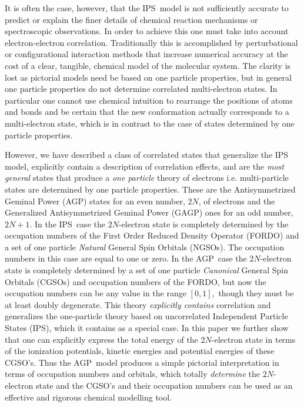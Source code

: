 \documentclass{preprint}
\begin{document}
It is often the case, however, that the IPS\ model is not sufficiently
accurate to predict or explain the finer details of chemical reaction
mechanisms or spectroscopic observations. In order to achieve this one must
take into account electron-electron correlation. Traditionally this is
accomplished by perturbational or configurational interaction methods that
increase numerical accuracy at the cost of a clear, tangible, chemical model
of the molecular system. The clarity is lost as pictorial models need be
based on one particle properties, but in general one particle properties do
not determine correlated multi-electron states. In particular one cannot use
chemical intuition to rearrange the positions of atoms and bonds and be
certain that the new conformation actually corresponds to a multi-electron
state, which is in contrast to the case of states determined by one particle
properties.

However, we have described \cite{Weiner&ortiz04} a class of correlated
states that generalize the IPS model, explicitly contain a description of
correlation effects, and are the \emph{most general} states that produce a
\emph{one particle} theory of electrons i.e. multi-particle states are
determined by one particle properties. These are the Antisymmetrized Geminal
Power (AGP) states for an even number, $2N$, of electrons and the
Generalized Antisymmetrized Geminal Power (GAGP) ones for an odd number, $%
2N+1$. In the IPS\ case the $2N$-electron state is completely determined by
the occupation numbers of the First Order Reduced Density Operator (FORDO)
and a set of one particle \emph{Natural }General Spin Orbitals (NGSOs). The
occupation numbers in this case are equal to one or zero. In the AGP\ case
the $2N$-electron state is completely determined by a set of one particle
\emph{Canonical }General Spin Orbitals (CGSOs) and occupation numbers of the
FORDO, but now the occupation numbers can be any value in the range $\left[
0,1\right] ,$ though they must be at least doubly degenerate. This theory
\emph{explicitly contains} correlation and generalizes the one-particle
theory based on uncorrelated Independent Particle States (IPS), which it
contains as a special case. In this paper we further show that one can
explicitly express the total energy of the $2N$-electron state in terms of
the ionization potentials, kinetic energies and potential energies of these
CGSO's. Thus the AGP\ model produces a simple pictorial interpretation in
terms of occupation numbers and orbitals, which totally \emph{determine} the
$2N$-electron state and the CGSO's and their occupation numbers can be used
as an effective and rigorous chemical modelling tool.
\end{document}

